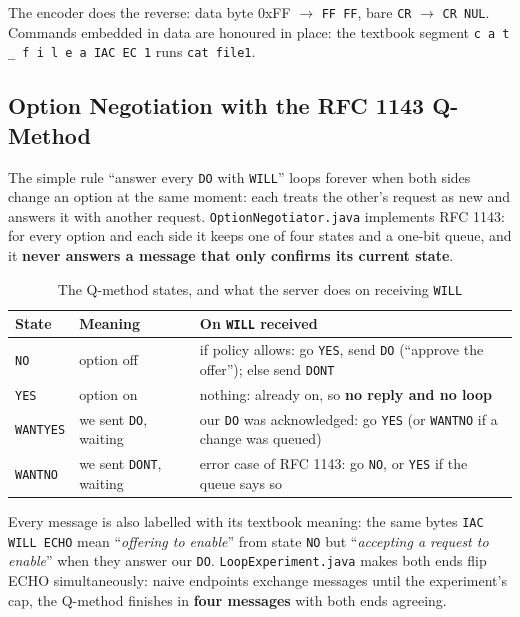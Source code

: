 \documentclass[11pt,a4paper]{article}
\begin{document}
\noindent The encoder does the reverse: data byte 0xFF $\rightarrow$ \texttt{FF FF}, bare \texttt{CR} $\rightarrow$ \texttt{CR NUL}. Commands embedded in data are honoured in place: the textbook segment \texttt{c a t \_ f i l e a IAC EC 1} runs \texttt{cat file1}.

\subsection{Option Negotiation with the RFC 1143 Q-Method}
The simple rule ``answer every \texttt{DO} with \texttt{WILL}'' loops forever when both sides change an option at the same moment: each treats the other's request as new and answers it with another request. \texttt{OptionNegotiator.java} implements RFC 1143: for every option and each side it keeps one of four states and a one-bit queue, and it \textbf{never answers a message that only confirms its current state}.

\begin{table}[H]
\centering
\caption{The Q-method states, and what the server does on receiving \texttt{WILL}}
\small
\begin{tabularx}{\textwidth}{@{}llY@{}}
\toprule
\textbf{State} & \textbf{Meaning} & \textbf{On \texttt{WILL} received} \\ \midrule
\texttt{NO} & option off & if policy allows: go \texttt{YES}, send \texttt{DO} (``approve the offer''); else send \texttt{DONT} \\
\texttt{YES} & option on & nothing: already on, so \textbf{no reply and no loop} \\
\texttt{WANTYES} & we sent \texttt{DO}, waiting & our \texttt{DO} was acknowledged: go \texttt{YES} (or \texttt{WANTNO} if a change was queued) \\
\texttt{WANTNO} & we sent \texttt{DONT}, waiting & error case of RFC 1143: go \texttt{NO}, or \texttt{YES} if the queue says so \\ \bottomrule
\end{tabularx}
\end{table}

\noindent Every message is also labelled with its textbook meaning: the same bytes \texttt{IAC WILL ECHO} mean ``\emph{offering to enable}'' from state \texttt{NO} but ``\emph{accepting a request to enable}'' when they answer our \texttt{DO}. \texttt{LoopExperiment.java} makes both ends flip ECHO simultaneously: naive endpoints exchange messages until the experiment's cap, the Q-method finishes in \textbf{four messages} with both ends agreeing.
\end{document}
